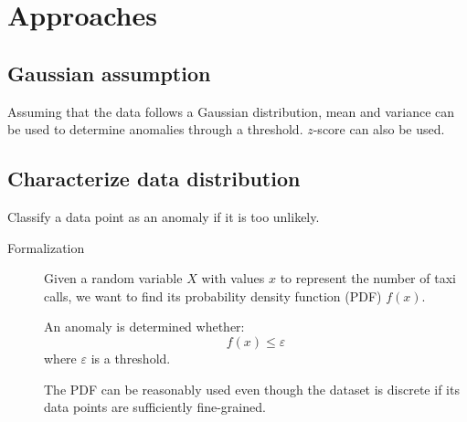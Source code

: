 \section{Approaches}


\subsection{Gaussian assumption}

Assuming that the data follows a Gaussian distribution, mean and variance can be used to determine anomalies through a threshold. $z$-score can also be used.


\subsection{Characterize data distribution}

Classify a data point as an anomaly if it is too unlikely.

\begin{description}
    \item[Formalization] 
        Given a random variable $X$ with values $x$ to represent the number of taxi calls, we want to find its probability density function (PDF) $f(x)$.

        An anomaly is determined whether:
        \[ f(x) \leq \varepsilon \]
        where $\varepsilon$ is a threshold.

        \begin{remark}
            The PDF can be reasonably used even though the dataset is discrete if its data points are sufficiently fine-grained.
        \end{remark}
\end{description}